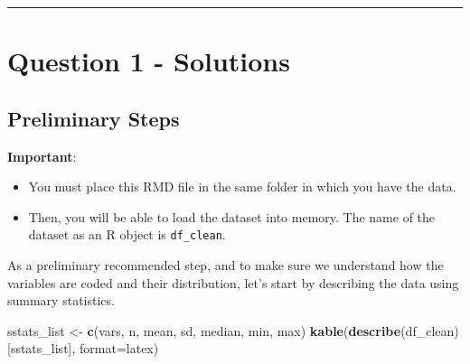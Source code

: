 \documentclass[
  11pt,
]{article}
\newenvironment{Shaded}{\begin{snugshade}}{\end{snugshade}}
\newcommand{\AttributeTok}[1]{\textcolor[rgb]{0.13,0.29,0.53}{#1}}
\newcommand{\FunctionTok}[1]{\textcolor[rgb]{0.13,0.29,0.53}{\textbf{#1}}}
\newcommand{\NormalTok}[1]{#1}
\newcommand{\OtherTok}[1]{\textcolor[rgb]{0.56,0.35,0.01}{#1}}
\newcommand{\StringTok}[1]{\textcolor[rgb]{0.31,0.60,0.02}{#1}}
\providecommand{\tightlist}{%
  \setlength{\itemsep}{0pt}\setlength{\parskip}{0pt}}
\begin{document}
\newpage

\begin{center}\rule{0.5\linewidth}{0.5pt}\end{center}

\section{Question 1 - Solutions}\label{question-1---solutions}

\subsection{Preliminary Steps}\label{preliminary-steps}

\textbf{Important}:

\begin{itemize}
\tightlist
\item
  You must place this RMD file in the same folder in which you have the
  data.
\item
  Then, you will be able to load the dataset into memory. The name of
  the dataset as an R object is \texttt{df\_clean}.
\end{itemize}

As a preliminary recommended step, and to make sure we understand how
the variables are coded and their distribution, let's start by
describing the data using summary statistics.

\begin{Shaded}
\begin{Highlighting}[]
\NormalTok{sstats\_list }\OtherTok{\textless{}{-}} \FunctionTok{c}\NormalTok{(}\StringTok{\textquotesingle{}vars\textquotesingle{}}\NormalTok{, }\StringTok{\textquotesingle{}n\textquotesingle{}}\NormalTok{, }\StringTok{\textquotesingle{}mean\textquotesingle{}}\NormalTok{, }\StringTok{\textquotesingle{}sd\textquotesingle{}}\NormalTok{, }\StringTok{\textquotesingle{}median\textquotesingle{}}\NormalTok{, }\StringTok{\textquotesingle{}min\textquotesingle{}}\NormalTok{, }\StringTok{\textquotesingle{}max\textquotesingle{}}\NormalTok{)}
\FunctionTok{kable}\NormalTok{(}\FunctionTok{describe}\NormalTok{(df\_clean)[sstats\_list], }\AttributeTok{format=}\StringTok{\textquotesingle{}latex\textquotesingle{}}\NormalTok{)}
\end{Highlighting}
\end{Shaded}
\end{document}
